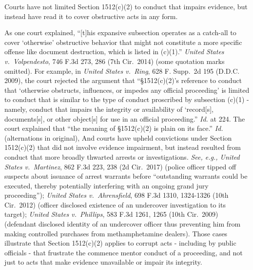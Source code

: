 Courts have not limited Section 1512(c)(2) to conduct that impairs evidence, but instead have read it to cover obstructive acts in any form.

As one court explained, “[t]his expansive subsection operates as a catch-all to cover ‘otherwise’ obstructive behavior that might not constitute a more specific offense like document destruction, which is listed in (c)(1).”
\textit{United States v.\ Volpendesto}, 746 F.3d 273, 286 (7th Cir.~2014) (some quotation marks omitted).
For example, in \textit{United States v.\ Ring}, 628 F. Supp.~2d 195 (D.D.C. 2009), the court rejected the argument that “\S 1512(c)(2)’s reference to conduct that ‘otherwise obstructs, influences, or impedes any official proceeding’ is limited to conduct that is similar to the type of conduct proscribed by subsection (c)(1) - namely, conduct that impairs the integrity or availability of ‘record[s], documents[s], or other object[s] for use in an official proceeding.”
\textit{Id.} at 224.
The court explained that “the meaning of \S 1512(c)(2) is plain on its face.”
\textit{Id.} (alternations in original), And courts have upheld convictions under Section 1512(c)(2) that did not involve evidence impairment, but instead resulted from conduct that more broadly thwarted arrests or investigations.
\textit{See, e.g., United States v.\ Martinez}, 862 F.3d 223, 238 (2d Cir.~2017) (police officer tipped off suspects about issuance of arrest warrants before “outstanding warrants could be executed, thereby potentially interfering with an ongoing grand jury proceeding”);
\textit{United States v.\ Ahrensfield}, 698 F.3d 1310, 1324-1326 (10th Cir.~2012) (officer disclosed existence of an undercover investigation to its target);
\textit{United States v.\ Phillips}, 583 F.3d 1261, 1265 (10th Cir.~2009) (defendant disclosed identity of an undercover officer thus preventing him from making controlled purchases from methamphetamine dealers).
Those cases illustrate that Section 1512(c)(2) applies to corrupt acts - including by public officials - that frustrate the commence mentor conduct of a proceeding, and not just to acts that make evidence unavailable or impair its integrity.

